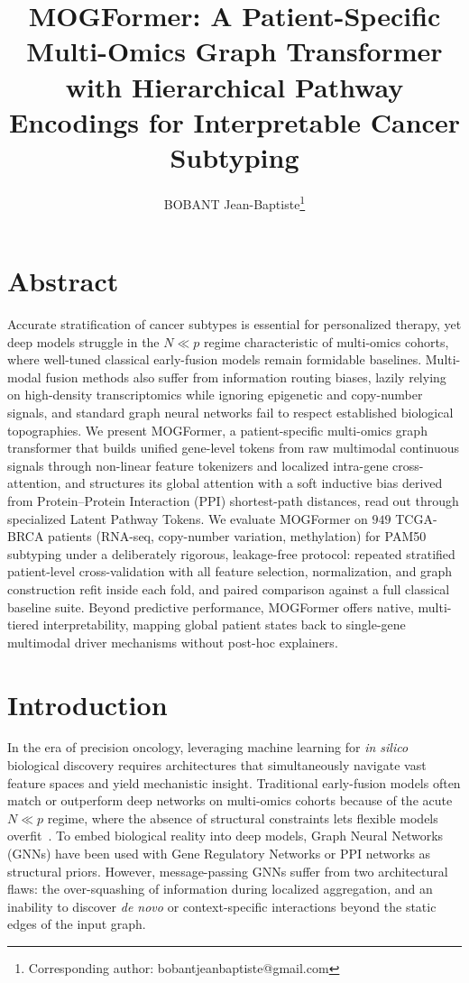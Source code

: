 \documentclass[10pt, twocolumn]{article}
\title{\vspace{-1.5cm} \textbf{MOGFormer: A Patient-Specific Multi-Omics Graph Transformer with Hierarchical Pathway Encodings for Interpretable Cancer Subtyping}}
\author[1]{BOBANT Jean-Baptiste\thanks{Corresponding author: bobantjeanbaptiste@gmail.com}}
\affil[1]{\small CentraleSupélec, Paris-Saclay University, France}
\date{}
\begin{document}
\maketitle

\section*{Abstract}
Accurate stratification of cancer subtypes is essential for personalized
therapy, yet deep models struggle in the $N \ll p$ regime characteristic of
multi-omics cohorts, where well-tuned classical early-fusion models remain
formidable baselines. Multi-modal fusion methods also suffer from information
routing biases, lazily relying on high-density transcriptomics while ignoring
epigenetic and copy-number signals, and standard graph neural networks fail to
respect established biological topographies. We present MOGFormer, a
patient-specific multi-omics graph transformer that builds unified gene-level
tokens from raw multimodal continuous signals through non-linear feature
tokenizers and localized intra-gene cross-attention, and structures its global
attention with a soft inductive bias derived from Protein--Protein Interaction
(PPI) shortest-path distances, read out through specialized Latent Pathway
Tokens. We evaluate MOGFormer on $949$ TCGA-BRCA patients (RNA-seq, copy-number variation,
methylation) for PAM50 subtyping under a deliberately rigorous, leakage-free
protocol: repeated stratified patient-level cross-validation with all feature
selection, normalization, and graph construction refit inside each fold, and
paired comparison against a full classical baseline suite. Beyond predictive
performance, MOGFormer offers native, multi-tiered interpretability, mapping
global patient states back to single-gene multimodal driver mechanisms without
post-hoc explainers.

\section*{Introduction}

In the era of precision oncology, leveraging machine learning for \textit{in
silico} biological discovery requires architectures that simultaneously navigate
vast feature spaces and yield mechanistic insight. Traditional early-fusion
models often match or outperform deep networks on multi-omics cohorts because of
the acute $N \ll p$ regime, where the absence of structural constraints lets
flexible models overfit~\cite{gorishniy2022,wang2021mogonet}. To embed biological
reality into deep models, Graph Neural Networks (GNNs) have been used with Gene
Regulatory Networks or PPI networks as structural priors. However, message-passing
GNNs suffer from two architectural flaws: the over-squashing of information during
localized aggregation, and an inability to discover \textit{de novo} or
context-specific interactions beyond the static edges of the input graph.
\end{document}
